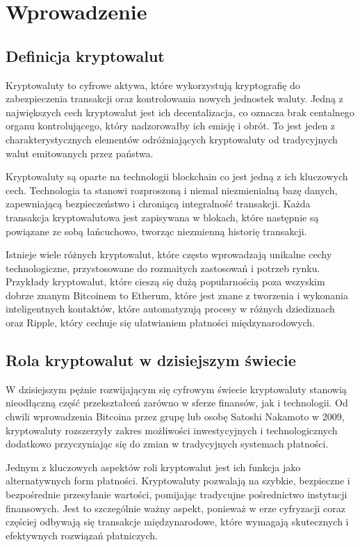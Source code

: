\clearpage
\chapter{Wprowadzenie}
\section{Definicja kryptowalut}
Kryptowaluty to cyfrowe aktywa, które wykorzystują kryptografię do zabezpieczenia transakcji oraz kontrolowania nowych jednostek waluty. Jedną z największych cech kryptowalut jest ich decentalizacja, co oznacza brak centalnego organu kontrolującego, który nadzorowałby ich emisję i obrót. To jest jeden z charakterystycznych elementów odróżniających kryptowaluty od tradycyjnych walut emitowanych przez państwa. 

Kryptowaluty są oparte na technologii blockchain co jest jedną z ich kluczowych cech. Technologia ta stanowi rozproszoną i niemal niezmienialną bazę danych, zapewniającą bezpieczeństwo i chroniącą integralność transakcji. Każda transakcja kryptowalutowa jest zapisywana w blokach, które następnie są powiązane ze sobą łańcuchowo, tworząc niezmienną historię transakcji.

Istnieje wiele różnych kryptowalut, które często wprowadzają unikalne cechy technologiczne, przystosowane do rozmaitych zastosowań i potrzeb rynku. Przykłady kryptowalut, które cieszą się dużą popularnością poza wszyskim dobrze znanym Bitcoinem to Etherum, które jest znane z tworzenia i wykonania inteligentnych kontaktów, które automatyzują procesy w różnych dziediznach oraz Ripple, który cechuje się ułatwianiem płatności międzynarodowych.

\section{Rola kryptowalut w dzisiejszym świecie}
W dzisiejszym pężnie rozwijającym się cyfrowym świecie kryptowaluty stanowią nieodłączną część przekształceń zarówno w sferze finansów, jak i technologii. Od chwili wprowadzenia Bitcoina przez grupę lub osobę Satoshi Nakamoto w 2009, kryptowaluty rozszerzyły zakres możliwości inwestycyjnych i technologicznych dodatkowo przyczyniając się do zmian w tradycyjnych systemach płatności. 

Jednym z kluczowych aspektów roli kryptowalut jest ich funkcja jako alternatywnych form płatności. Kryptowaluty pozwalają na szybkie, bezpieczne i bezpośrednie przesyłanie wartości, pomijając tradycujne pośrednictwo instytucji finansowych. Jest to szczególnie ważny aspekt, ponieważ w erze cyfryzacji coraz częściej odbywają się transakcje międzynarodowe, które wymagają skutecznych i efektywnych rozwiązań płatniczych.

